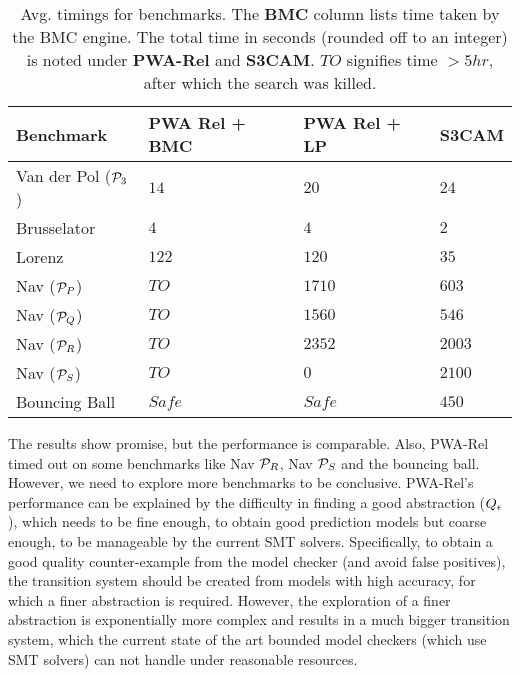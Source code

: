 \begin{table}[!htbp]
\centering
\caption{Avg. timings for benchmarks. The \textbf{BMC} column lists
time taken by the BMC engine. The total time in seconds (rounded off
to an integer) is noted under \textbf{PWA-Rel} and \textbf{S3CAM}.
$TO$ signifies time $>5hr$, after which the search was killed.}
\label{tab:res-rel}
\begin{tabular}{@{}llll@{}}
\toprule
    Benchmark & PWA Rel + BMC & PWA Rel + LP & S3CAM\\
\midrule
    Van der Pol ($\mathcal{P}_3$)   &$14$ & $20$ & $24$\\
    Brusselator               &$4$ & $4$ & $2$\\
    Lorenz                    &$122$ & $120$ & $35$\\
    Nav ($\mathcal{P}_P$)           &$TO$ & $1710$  & $603$ \\%
    Nav ($\mathcal{P}_Q$)           &$TO$ & $1560$   & $546$ \\%
    Nav ($\mathcal{P}_R$)           &$TO$ & $2352$  & $2003$\\
    Nav ($\mathcal{P}_S$)           &$TO$ & $0$  & $2100$\\
    Bouncing Ball             &$Safe$ & $Safe$  & $450$\\

\bottomrule
\end{tabular}
\end{table}


The results show promise, but the performance is comparable. Also,
PWA-Rel timed out on some benchmarks like Nav $\mathcal{P}_R$, Nav $\mathcal{P}_S$
and the bouncing ball. However, we need to explore more benchmarks to
be conclusive. PWA-Rel's performance can be explained by the
difficulty in finding a good abstraction ($Q_\epsilon$), which
needs to be fine enough, to obtain good prediction models but coarse
enough, to be manageable by the current SMT solvers. Specifically, to
obtain a good quality counter-example from the model checker (and
avoid false positives), the transition system should be created from
models with high accuracy, for which a finer abstraction is required.
However, the exploration of a finer abstraction is exponentially more
complex and results in a much bigger transition system, which the
current state of the art bounded model checkers (which use SMT
solvers) can not handle under reasonable resources.
